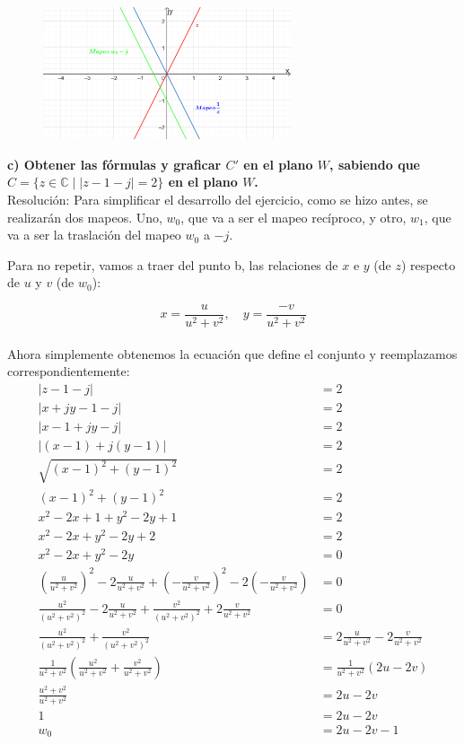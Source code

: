\documentclass[12pt]{report}
\begin{document}
\begin{figure}[h] %
    \centering %
    \includegraphics[width=0.65\textwidth]{./Imagenes/foto1Ej3.png} %
\end{figure}

\textbf{c) Obtener las fórmulas y graficar \( C' \) en el plano \( W \), sabiendo que \( C = \{z \in \mathbb{C} \mid |z - 1 - j| = 2\} \) en el plano \( W \).}\\[6pt]

Resolución: Para simplificar el desarrollo del ejercicio, como se hizo antes, se realizarán dos mapeos. Uno, \( w_0 \), que va a ser el mapeo recíproco, y otro, \( w_1 \), que va a ser la traslación del mapeo \( w_0 \) a \( -j \).

Para no repetir, vamos a traer del punto b, las relaciones de \( x \) e \( y \) (de \( z \)) respecto de \( u \) y \( v \) (de \( w_0 \)):

$$ x = \frac{u}{u^2 + v^2}, \quad y = \frac{-v}{u^2 + v^2} $$\\[6pt]
Ahora simplemente obtenemos la ecuación que define el conjunto y reemplazamos correspondientemente:\\
\begin{align*}
|z-1-j| &= 2 \\[6pt]
|x+jy-1-j|  &= 2 \\[6pt]
|x-1+jy-j| &= 2 \\[6pt]
|(x-1)+j(y-1)| &= 2 \\[6pt]
\sqrt{(x-1)^2 + (y-1)^2} &= 2 \\[6pt]
(x-1)^2 + (y-1)^2 &= 2 \\[6pt]
x^2 - 2x + 1 + y^2 - 2y + 1 &= 2 \\[6pt]
x^2 - 2x + y^2 - 2y + 2 &= 2 \\[6pt]
x^2 - 2x + y^2 - 2y &= 0 \\[6pt]
\left(\frac{u}{u^2+v^2} \right)^2 - 2\frac{u}{u^2+v^2} + \left( -\frac{v}{u^2+v^2} \right)^2-2 \left( -\frac{v}{u^2+v^2} \right) &=0\\[6pt]
\frac{u^2}{(u^2+v^2)^2}-2\frac{u}{u^2+v^2} + \frac{v^2}{(u^2+v^2)^2}+2\frac{v}{u^2+v^2}&=0\\[6pt]
\frac{u^2}{(u^2+v^2)^2}+\frac{v^2}{(u^2+v^2)^2}&=2\frac{u}{u^2+v^2} - 2 \frac{v}{u^2+v^2}\\[6pt]
\frac{1}{u^2+v^2} \left( \frac{u^2}{u^2+v^2} + \frac{v^2}{u^2+v^2} \right) &= \frac{1}{u^2+v^2}(2u-2v)\\[6pt]
\frac{u^2+v^2}{u^2+v^2}&=2u-2v\\[6pt]
1 &= 2u - 2v \\[6pt]
w_0 &= 2u - 2v - 1\\[6pt]
\end{align*}
 
\end{document}
